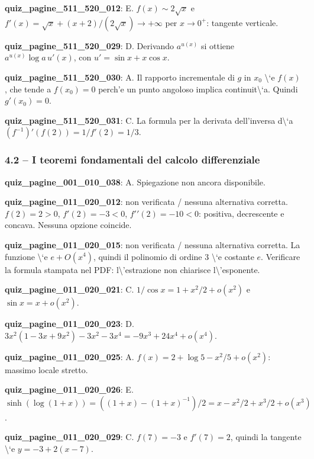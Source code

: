 \documentclass[11pt,a4paper]{article}
\newcounter{quiz}
\begin{document}
\noindent\textbf{quiz\_pagine\_511\_520\_012}: E. $f(x)\sim2\sqrt{x}$ e $f'(x)=\sqrt{x}+(x+2)/(2\sqrt{x})\to+\infty$ per $x\to0^+$: tangente verticale.\par\medskip
\noindent\textbf{quiz\_pagine\_511\_520\_029}: D. Derivando $a^{u(x)}$ si ottiene $a^{u(x)}\log a\,u'(x)$, con $u'=\sin x+x\cos x$.\par\medskip
\noindent\textbf{quiz\_pagine\_511\_520\_030}: A. Il rapporto incrementale di $g$ in $x_0$ \textbackslash{}`e $f(x)$, che tende a $f(x_0)=0$ perch'e un punto angoloso implica continuit\textbackslash{}`a. Quindi $g'(x_0)=0$.\par\medskip
\noindent\textbf{quiz\_pagine\_511\_520\_031}: C. La formula per la derivata dell'inversa d\textbackslash{}`a $(f^{-1})'(f(2))=1/f'(2)=1/3$.\par\medskip
\subsubsection*{4.2 -- I teoremi fondamentali del calcolo differenziale}
\noindent\textbf{quiz\_pagine\_001\_010\_038}: A. Spiegazione non ancora disponibile.\par\medskip
\noindent\textbf{quiz\_pagine\_011\_020\_012}: non verificata / nessuna alternativa corretta. $f(2)=2>0$, $f\prime(2)=-3<0$, $f\prime\prime(2)=-10<0$: positiva, decrescente e concava. Nessuna opzione coincide.\par\medskip
\noindent\textbf{quiz\_pagine\_011\_020\_015}: non verificata / nessuna alternativa corretta. La funzione \textbackslash{}`e $e+O(x^4)$, quindi il polinomio di ordine 3 \textbackslash{}`e costante $e$. Verificare la formula stampata nel PDF: l\textbackslash{}'estrazione non chiarisce l\textbackslash{}'esponente.\par\medskip
\noindent\textbf{quiz\_pagine\_011\_020\_021}: C. $1/\cos x=1+x^2/2+o(x^2)$ e $\sin x=x+o(x^2)$.\par\medskip
\noindent\textbf{quiz\_pagine\_011\_020\_023}: D. $3x^2(1-3x+9x^2)-3x^2-3x^4=-9x^3+24x^4+o(x^4)$.\par\medskip
\noindent\textbf{quiz\_pagine\_011\_020\_025}: A. $f(x)=2+\log5-x^2/5+o(x^2)$: massimo locale stretto.\par\medskip
\noindent\textbf{quiz\_pagine\_011\_020\_026}: E. $\sinh(\log(1+x))=((1+x)-(1+x)^{-1})/2=x-x^2/2+x^3/2+o(x^3)$.\par\medskip
\noindent\textbf{quiz\_pagine\_011\_020\_029}: C. $f(7)=-3$ e $f\prime(7)=2$, quindi la tangente \textbackslash{}`e $y=-3+2(x-7)$.\par\medskip
\end{document}
